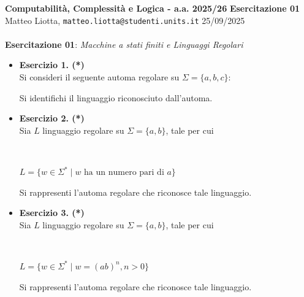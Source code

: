 \documentclass[a4paper,10pt]{article}
\newcommand{\EsercitazioneNum}{01}
\newcommand{\Data}{25/09/2025}
\begin{document}
\footnotesize  %

\noindent
\small \textbf{Computabilità, Complessità e Logica - a.a. 2025/26} \hfill \textbf{Esercitazione \EsercitazioneNum} \\[0.2cm]
\scriptsize Matteo Liotta, \texttt{matteo.liotta@studenti.units.it} \hfill \Data \\[0.2cm]

\noindent\makebox[\linewidth]{\rule{\linewidth}{0.4pt}} \\[1cm]


\noindent\Large \textbf{Esercitazione 01}: \textit{Macchine a stati finiti e Linguaggi Regolari}\\[0.4cm]
{\normalsize
\begin{itemize}[label=, leftmargin=0pt]

    \item \textbf{Esercizio 1. (*)}\\
    Si consideri il seguente automa regolare su $\Sigma = \{a,b,c \}$:
    {
    \small
    \begin{center}
    \end{center}
    }
    Si identifichi il linguaggio riconosciuto dall'automa.
 
    \item \textbf{Esercizio 2. (*)}\\ Sia $L$ linguaggio regolare su $\Sigma=\{a,b\}$, tale per cui 
    {\\ \begin{center}
        $L = \{ w\in \Sigma^* \mid w \text{\ ha\ un\ numero\ pari\ di\ } a \}$\\
    \end{center}}
    Si rappresenti l'automa regolare che riconosce tale linguaggio.


    
    \item \textbf{Esercizio 3. (*)}\\ Sia $L$ linguaggio regolare su $\Sigma=\{a,b\}$, tale per cui 
    {\\ \begin{center}
        $L = \{ w \in \Sigma^* \mid w = (ab)^n, n>0 \}$
    \end{center}} 
    Si rappresenti l'automa regolare che riconosce tale linguaggio.




\end{itemize}}
\end{document}
